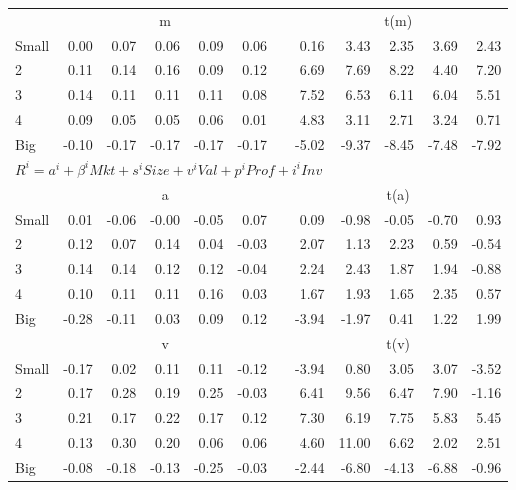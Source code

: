 \begin{table}[!ht]
\begin{tabular}{lrrrrrlrrrrr}
      & \multicolumn{5}{c}{m} & & \multicolumn{5}{c}{t(m)}
    
    \\
      \cmidrule(r){2-6} \cmidrule(r){8-12}

    Small   & 0.00  & 0.07  & 0.06  & 0.09  & 0.06 &  & 0.16  & 3.43  & 2.35  & 3.69  & 2.43  \\
         2  & 0.11  & 0.14  & 0.16  & 0.09  & 0.12 &  & 6.69  & 7.69  & 8.22  & 4.40  & 7.20  \\
         3  & 0.14  & 0.11  & 0.11  & 0.11  & 0.08 &  & 7.52  & 6.53  & 6.11  & 6.04  & 5.51  \\
         4  & 0.09  & 0.05  & 0.05  & 0.06  & 0.01 &  & 4.83  & 3.11  & 2.71  & 3.24  & 0.71  \\
    Big     & -0.10  & -0.17  & -0.17  & -0.17  & -0.17 & & -5.02  & -9.37  & -8.45  & -7.48  & -7.92  \\

  
  \midrule
  \multicolumn{12}{l}{$R^i=a^i+\beta^iMkt+s^iSize+v^iVal+p^iProf+i^iInv$} \\

  
    
      & \multicolumn{5}{c}{a} & & \multicolumn{5}{c}{t(a)}
    
    \\
      \cmidrule(r){2-6} \cmidrule(r){8-12}

    Small   & 0.01  & -0.06  & -0.00  & -0.05  & 0.07 & & 0.09  & -0.98  & -0.05  & -0.70  & 0.93  \\
         2  & 0.12  & 0.07  & 0.14  & 0.04  & -0.03 & & 2.07  & 1.13  & 2.23  & 0.59  & -0.54  \\
         3  & 0.14  & 0.14  & 0.12  & 0.12  & -0.04 & & 2.24  & 2.43  & 1.87  & 1.94  & -0.88  \\
         4  & 0.10  & 0.11  & 0.11  & 0.16  & 0.03 & & 1.67  & 1.93  & 1.65  & 2.35  & 0.57  \\
    Big     & -0.28  & -0.11  & 0.03  & 0.09  & 0.12 & & -3.94  & -1.97  & 0.41  & 1.22  & 1.99  \\

  
    
      & \multicolumn{5}{c}{v} & & \multicolumn{5}{c}{t(v)}
    
    \\
      \cmidrule(r){2-6} \cmidrule(r){8-12}

    Small   & -0.17  & 0.02  & 0.11  & 0.11  & -0.12 & & -3.94  & 0.80  & 3.05  & 3.07  & -3.52  \\
         2  & 0.17  & 0.28  & 0.19  & 0.25  & -0.03 & & 6.41  & 9.56  & 6.47  & 7.90  & -1.16  \\
         3  & 0.21  & 0.17  & 0.22  & 0.17  & 0.12 & & 7.30  & 6.19  & 7.75  & 5.83  & 5.45  \\
         4  & 0.13  & 0.30  & 0.20  & 0.06  & 0.06 & & 4.60  & 11.00  & 6.62  & 2.02  & 2.51  \\
    Big     & -0.08  & -0.18  & -0.13  & -0.25  & -0.03 & & -2.44  & -6.80  & -4.13  & -6.88  & -0.96  \\


\end{tabular}
\end{table}

